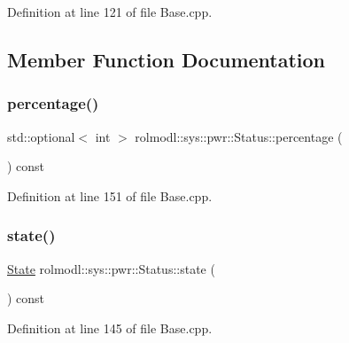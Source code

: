 Definition at line 121 of file Base.\+cpp.



\subsection{Member Function Documentation}
\mbox{\label{structrolmodl_1_1sys_1_1pwr_1_1_status_a6601c271fdacfbc8aab1ae99a1e523d9}} 
\subsubsection{\texorpdfstring{percentage()}{percentage()}}
{\footnotesize\ttfamily std\+::optional$<$ int $>$ rolmodl\+::sys\+::pwr\+::\+Status\+::percentage (\begin{DoxyParamCaption}{ }\end{DoxyParamCaption}) const\hspace{0.3cm}{\ttfamily [noexcept]}}



Definition at line 151 of file Base.\+cpp.

\mbox{\label{structrolmodl_1_1sys_1_1pwr_1_1_status_a5ff0627375a1689b2860572f677f3ab5}} 
\subsubsection{\texorpdfstring{state()}{state()}}
{\footnotesize\ttfamily \mbox{\hyperlink{namespacerolmodl_1_1sys_1_1pwr_ae84fe28ac28fdac077ff5363a4fc0dfb}{State}} rolmodl\+::sys\+::pwr\+::\+Status\+::state (\begin{DoxyParamCaption}{ }\end{DoxyParamCaption}) const\hspace{0.3cm}{\ttfamily [noexcept]}}



Definition at line 145 of file Base.\+cpp.

\mbox{\label{structrolmodl_1_1sys_1_1pwr_1_1_status_a2a4c2a84875f92838e3270cf93c20f53}} 
